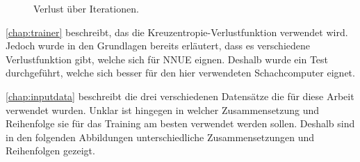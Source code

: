 \begin{figure}
  \centering
  \caption{Verlust über Iterationen.}
  \label{fig:loss}
\end{figure}





\autoref{chap:trainer} beschreibt, das die Kreuzentropie-Verlustfunktion verwendet wird. Jedoch wurde in den Grundlagen bereits erläutert, dass es verschiedene Verlustfunktion gibt, welche sich für \ac{NNUE} eignen. Deshalb wurde ein Test durchgeführt, welche sich besser für den hier verwendeten Schachcomputer eignet.

\autoref{chap:inputdata} beschreibt die drei verschiedenen Datensätze die für diese Arbeit verwendet wurden. Unklar ist hingegen in welcher Zusammensetzung und Reihenfolge sie für das Training am besten verwendet werden sollen. Deshalb sind in den folgenden Abbildungen unterschiedliche Zusammensetzungen und Reihenfolgen gezeigt.
